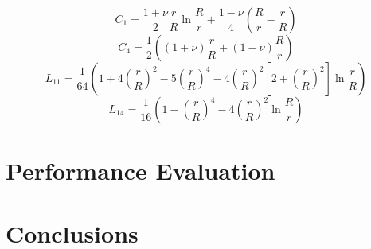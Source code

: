 \documentclass[10pt,letterpaper]{report}
\numberwithin{equation}{chapter}
\begin{document}
\[C_1 = \frac{1+\nu}{2}\frac{r}{R} \ln \frac{R}{r}+\frac{1-\nu}{4} \left( \frac{R}{r} - \frac{r}{R}\right)\]
\[C_4 = \frac{1}{2} \left( (1+\nu)\frac{r}{R} + (1-\nu) \frac{R}{r} \right)\]
\[L_{11} = \frac{1}{64} \left(1 + 4 \left( \frac{r}{R}\right)^2 -5\left( \frac{r}{R}\right)^4 -4\left( \frac{r}{R}\right)^2\left[ 2 + \left( \frac{r}{R}\right)^2 \right] \ln  \frac{r}{R} \right) \]
\[L_{14} = \frac{1}{16} \left(1 - \left( \frac{r}{R}\right)^4 - 4\left( \frac{r}{R}\right)^2  \ln  \frac{R}{r}  \right)\]


\chapter{Performance Evaluation}

\chapter{Conclusions}
\end{document}
